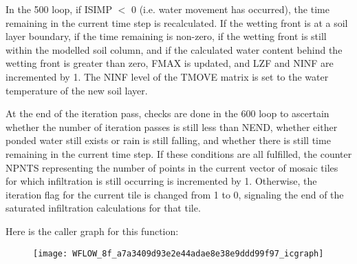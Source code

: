 In the 500 loop, if I\+S\+I\+M\+P $<$ 0 (i.\+e. water movement has occurred), the time remaining in the current time step is recalculated. If the wetting front is at a soil layer boundary, if the time remaining is non-\/zero, if the wetting front is still within the modelled soil column, and if the calculated water content behind the wetting front is greater than zero, F\+M\+A\+X is updated, and L\+Z\+F and N\+I\+N\+F are incremented by 1. The N\+I\+N\+F level of the T\+M\+O\+V\+E matrix is set to the water temperature of the new soil layer.

At the end of the iteration pass, checks are done in the 600 loop to ascertain whether the number of iteration passes is still less than N\+E\+N\+D, whether either ponded water still exists or rain is still falling, and whether there is still time remaining in the current time step. If these conditions are all fulfilled, the counter N\+P\+N\+T\+S representing the number of points in the current vector of mosaic tiles for which infiltration is still occurring is incremented by 1. Otherwise, the iteration flag for the current tile is changed from 1 to 0, signaling the end of the saturated infiltration calculations for that tile.

Here is the caller graph for this function\+:\nopagebreak
\begin{figure}[H]
\begin{center}
\leavevmode
\texttt{[image: WFLOW\_8f\_a7a3409d93e2e44adae8e38e9ddd99f97\_icgraph]}
\end{center}
\end{figure}


